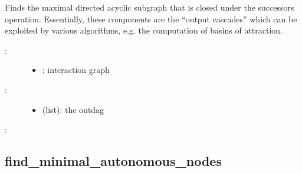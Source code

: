 \documentclass[letterpaper,10pt,english]{sphinxmanual}
\begin{document}
\begin{fulllineitems}
\label{\detokenize{InteractionGraphs:PyBoolNet.InteractionGraphs.find_outdag}}
Finds the maximal directed acyclic subgraph that is closed under the successors operation.
Essentially, these components are the “output cascades” which can be exploited by various algorithms, e.g.
the computation of basins of attraction.
\begin{description}
\item[{:}] \leavevmode\begin{itemize}
\item {} 
: interaction graph

\end{itemize}

\item[{:}] \leavevmode\begin{itemize}
\item {} 
 (list): the outdag

\end{itemize}

\end{description}

:

\begin{sphinxVerbatim}[commandchars=\\\{\}]
\end{sphinxVerbatim}

\end{fulllineitems}



\subsection{find\_minimal\_autonomous\_nodes}
\label{\detokenize{InteractionGraphs:find-minimal-autonomous-nodes}}\label{\detokenize{InteractionGraphs:id4}}
\end{document}
